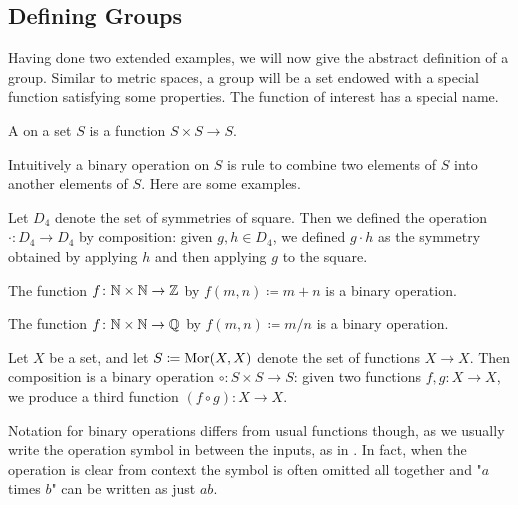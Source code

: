 \documentclass[../main.tex]{subfiles}
\begin{document}
\subsection{Defining Groups}
Having done two extended examples, we will now give the abstract definition of a group. Similar to metric spaces, a group will be a set endowed with a special function satisfying some properties. The function of interest has a special name.
\begin{definition}
    A  on a set $S$ is a function $S \times S \to S$.
\end{definition}
Intuitively a binary operation on $S$ is rule to combine two elements of $S$ into another elements of $S$. Here are some examples.
\begin{example} \label{ex:d4-comp}
    Let $D_4$ denote the set of symmetries of square. Then we defined the operation $\cdot\colon D_4\to D_4$ by composition: given $g,h\in D_4$, we defined $g\cdot h$ as the symmetry obtained by applying $h$ and then applying $g$ to the square.
\end{example}
\begin{example} \label{ex:add-is-bin-op}
    The function $f\colon\mathbb N\times\mathbb N\to\mathbb Z$ by $f(m,n)\coloneqq m+n$ is a binary operation.
\end{example}
\begin{example}
    The function $f\colon\mathbb N\times\mathbb N\to\mathbb Q$ by $f(m,n)\coloneqq m/n$ is a binary operation.
\end{example}
\begin{example} \label{ex:comp-is-bin-op}
    Let $X$ be a set, and let $S\coloneqq\operatorname{Mor}(X,X)$ denote the set of functions $X\to X$. Then composition is a binary operation $\circ\colon S\times S\to S$: given two functions $f,g\colon X\to X$, we produce a third function $(f\circ g)\colon X\to X$.
\end{example}
Notation for binary operations differs from usual functions though, as we usually write the operation symbol in between the inputs, as in .
In fact, when the operation is clear from context the symbol is often omitted all together and "$a$ times $b$" can be written as just $ab$.
\end{document}
